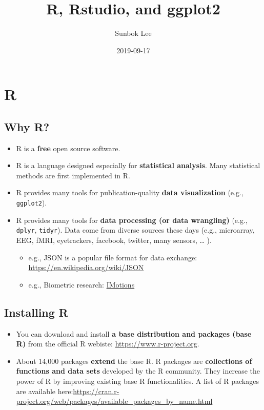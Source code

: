 \documentclass[]{book}
\title{R, Rstudio, and ggplot2}
\author{Sunbok Lee}
\date{2019-09-17}
\providecommand{\tightlist}{%
  \setlength{\itemsep}{0pt}\setlength{\parskip}{0pt}}
\begin{document}
\maketitle

{
\setcounter{tocdepth}{1}
\tableofcontents
}
\hypertarget{r}{%
\chapter{R}\label{r}}

\hypertarget{why-r}{%
\section{Why R?}\label{why-r}}

\begin{itemize}
\tightlist
\item
  R is a \textbf{free} open source software.
\item
  R is a language designed especially for \textbf{statistical analysis}. Many statistical methods are first implemented in R.
\item
  R provides many tools for publication-quality \textbf{data visualization} (e.g., \texttt{ggplot2}).
\item
  R provides many tools for \textbf{data processing (or data wrangling)} (e.g., \texttt{dplyr}, \texttt{tidyr}). Data come from diverse sources these days (e.g., microarray, EEG, fMRI, eyetrackers, facebook, twitter, many sensors, \ldots{} ).

  \begin{itemize}
  \tightlist
  \item
    e.g., JSON is a popular file format for data exchange: \url{https://en.wikipedia.org/wiki/JSON}
  \item
    e.g., Biometric research: \href{https://imotions.com/?creative=287840870074\&keyword=imotions\&matchtype=p\&network=g\&device=c\&gclid=EAIaIQobChMI3pas5oOO5AIVlBx9Ch28hwboEAAYASAAEgJlUfD_BwE}{IMotions}
  \end{itemize}
\end{itemize}

\hypertarget{installing-r}{%
\section{Installing R}\label{installing-r}}

\begin{itemize}
\item
  You can download and install \textbf{a base distribution and packages (base R)} from the official R webiste: \url{https://www.r-project.org}.
\item
  About 14,000 packages \textbf{extend} the base R. R packages are \textbf{collections of functions and data sets} developed by the R community. They increase the power of R by improving existing base R functionalities. A list of R packages are available here:\url{https://cran.r-project.org/web/packages/available_packages_by_name.html}
\end{itemize}
\end{document}
